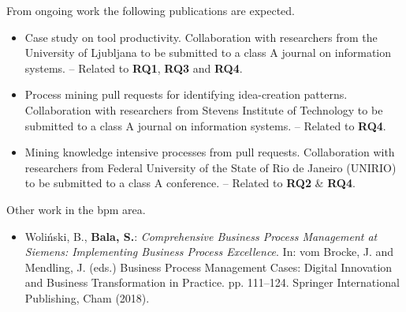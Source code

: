 \documentclass[a4paper,11pt]{article}
\begin{document}
\noindent From ongoing work the following publications are expected.

\begin{itemize}
	\item Case study on tool productivity. Collaboration with researchers from the University of Ljubljana to be submitted to a class A journal on information systems. -- Related to \textbf{RQ1}, \textbf{RQ3} and \textbf{RQ4}.
	
	\item Process mining pull requests for identifying idea-creation patterns. Collaboration with researchers from Stevens Institute of Technology to be submitted to a class A journal on information systems. -- Related to \textbf{RQ4}.
	
	\item Mining knowledge intensive processes from pull requests. Collaboration with researchers from Federal University of the State of Rio de Janeiro (UNIRIO) to be submitted to a class A conference. -- Related to \textbf{RQ2} \& \textbf{RQ4}.
	
\end{itemize}

\noindent Other work in the \gls{bpm} area.

\begin{itemize}
	\item Woli\'nski, B., \textbf{Bala, S.}: \textit{Comprehensive Business Process Management at Siemens: Implementing Business Process Excellence}. In: vom Brocke, J. and Mendling, J. (eds.) Business Process Management Cases: Digital Innovation and Business Transformation in Practice. pp. 111--124. Springer International Publishing, Cham (2018). \cite{Wolinski2018}
\end{itemize}



\end{document}
